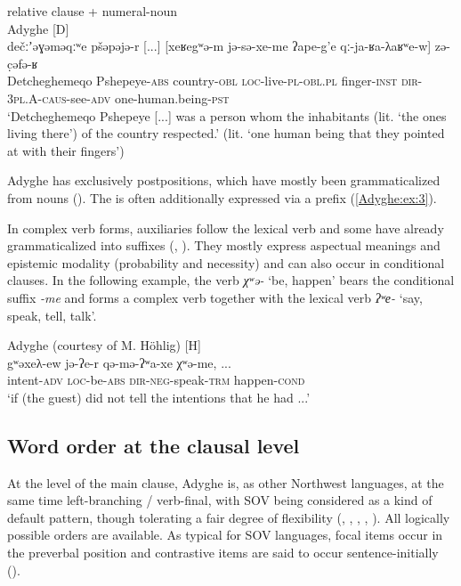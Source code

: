 \documentclass[output=paper,colorlinks,citecolor=brown, draft]{langscibook}
\begin{document}
\ea\label{Adyghe:ex:4}
relative clause + numeral-noun \\
Adyghe \citep{paris1974princesse} [D] \\
\gll dečːʼəɣəməqːʷe pšəpəjə-r [...] [xeʁegʷə-m jə-sə-xe-me ʔape-g'e qː-ja-ʁa-λaʁʷe-w] zə-c̣əfə-ʁ \\
Detcheghemeqo Pshepeye\textsc{-abs} {} country\textsc{-obl} \textsc{loc-}live\textsc{-pl-obl.pl} finger\textsc{-inst} \textsc{dir-}\textsc{3pl.A-}\textsc{caus-}see\textsc{-adv} one-human.being\textsc{-pst} \\
\glt `Detcheghemeqo Pshepeye [...] was a person whom the inhabitants (lit. `the ones living there') of the country respected.' (lit. `one human being that they pointed at with their fingers') 
\z

Adyghe has exclusively postpositions, which have mostly been grammaticalized from nouns (\citealt{arkadiev2018grammaticalization}). The   is often additionally expressed via a  prefix (\ref{Adyghe:ex:3}).

In complex verb forms, auxiliaries follow the lexical verb and some have already grammaticalized into suffixes (\citealt{kimmelman2011auxiliaries}, \citealt{arkadiev2018grammaticalization}). They mostly express aspectual meanings and epistemic modality (probability and necessity) and can also occur in conditional clauses. In the following example, the  verb \textit{χʷə-} `be, happen' bears the conditional suffix \textit{-me} and forms a complex verb together with the lexical verb \textit{ʔʷе-} `say, speak, tell, talk'.

\ea\label{Adyghe:ex:5}
Adyghe (courtesy of M. Höhlig) [H] \\
\gll gʷəxeλ-ew jə-ʔe-r qə-mə-ʔʷa-xe χʷə-me, ... \\
intent\textsc{-adv} \textsc{loc-}be\textsc{-abs} \textsc{dir-neg-}speak\textsc{-trm} happen\textsc{-cond} \\
\glt `if (the guest) did not tell the intentions that he had ...'
\z

\subsection{Word order at the clausal level}\label{Adyghe:ss:2.2}

\begin{sloppypar}
At the level of the main clause, Adyghe is, as other Northwest languages, at the same time left-branching / verb-final, with SOV being considered as a kind of default pattern, though tolerating a fair degree of flexibility (\citealt{jakovlev1941grammatika}, \citealt{rogava1966grammatika}, \citealt{kumakhov2009circassian}, \citealt{lander2014relativizacija}, \citealt{testelets2017adyghe}). All logically possible orders are available. As typical for SOV languages, focal items occur in the preverbal position and contrastive items are said to occur sentence-initially (\citealt{arkadiev2021northwest}).
\end{sloppypar}
\end{document}
